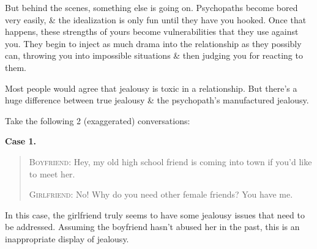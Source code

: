\documentclass{article}
\numberwithin{equation}{section}
\begin{document}
But behind the scenes, something else is going on. Psychopaths become bored very easily, \& the idealization is only fun until they have you hooked. Once that happens, these strengths of yours become vulnerabilities that they use against you. They begin to inject as much drama into the relationship as they possibly can, throwing you into impossible situations \& then judging you for reacting to them.

Most people would agree that jealousy is toxic in a relationship. But there's a huge difference between true jealousy \& the psychopath's manufactured jealousy.

Take the following 2 (exaggerated) conversations:

\textbf{Case 1.}
\begin{quotation}
	\textsc{Boyfriend}: Hey, my old high school friend is coming into town if you'd like to meet her.
	
	\textsc{Girlfriend}: No! Why do you need other female friends? You have me.
\end{quotation}
In this case, the girlfriend truly seems to have some jealousy issues that need to be addressed. Assuming the boyfriend hasn't abused her in the past, this is an inappropriate display of jealousy.
\end{document}
